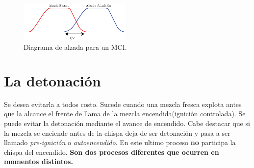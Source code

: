 \begin{figure}[htb!]
    \centering
    \includegraphics[width=0.49\textwidth]{fig/alzada.eps}
    \caption{Diagrama de alzada para un MCI.}
    \label{fig:alzadaMCI}
\end{figure}




\section{La detonación}
Se desea evitarla a todos costo. Sucede cuando una mezcla fresca explota antes que la alcance el frente de llama de la mezcla encendida(ignición controlada). Se puede evitar la detonación mediante el avance de encendido. Cabe destacar que si la mezcla se enciende antes de la chispa deja de ser detonación y pasa a ser llamado \textit{pre-ignición} o \textit{autoencendido}. En este ultimo proceso \textbf{no} participa la chispa del encendido. \textbf{Son dos procesos diferentes que ocurren en momentos distintos.}



